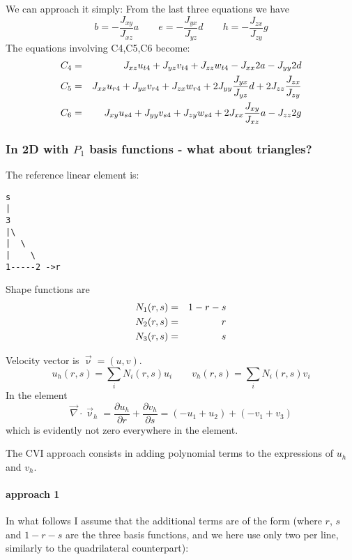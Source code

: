 We can approach it simply:
From the last three equations we have 
\[
b=-\frac{J_{xy}}{J_{xz}} a \quad\quad
e=-\frac{J_{yx}}{J_{yz}} d \quad\quad
h=-\frac{J_{zx}}{J_{zy}} g
\]
The equations involving C4,C5,C6 become:
\begin{eqnarray}
C_4 &=& J_{xz} u_{t4} + J_{yz} v_{t4} + J_{zz} w_{t4} -J_{xx} 2a - J_{yy} 2d  \nn\\ %
C_5 &=& J_{xx} u_{r4} + J_{yx} v_{r4} + J_{zx} w_{r4} +2J_{yy} \frac{J_{yx}}{J_{yz}} d + 2J_{zz} \frac{J_{zx}}{J_{zy}}  \nn\\ %
C_6 &=& J_{xy} u_{s4} + J_{yy} v_{s4} + J_{zy} w_{s4} +2J_{xx} \frac{J_{xy}}{J_{xz}} a - J_{zz} 2g  \nn\\ %
\end{eqnarray}

\subsubsection{In 2D with $P_1$ basis functions - what about triangles?}


The reference linear element is: 
\begin{verbatim}
s
|
3
|\
|  \
|    \
1-----2 ->r
\end{verbatim}

Shape functions are 
\begin{eqnarray}
N_1(r,s) &=& 1-r-s \nonumber\\
N_2(r,s) &=& r \nonumber\\
N_3(r,s) &=& s 
\end{eqnarray}

Velocity vector is $\vec\upnu=(u,v)$. 
\[
u_h(r,s)=\sum_i N_i(r,s) u_i
\qquad
v_h(r,s)=\sum_i N_i(r,s) v_i
\]
In the element
\[
\vec\nabla\cdot\vec\upnu_h = 
\frac{\partial u_h}{\partial r}
+
\frac{\partial v_h}{\partial s}
=(-u_1+u_2)+(-v_1+v_3)
\]
which is evidently not zero everywhere in the element.

The CVI approach consists in adding polynomial terms to the expressions of $u_h$ and $v_h$.

\paragraph{approach 1}
In what follows I assume that the additional terms are of the form (where $r$, $s$ and $1-r-s$ are the three basis functions, and we here use only two per line, similarly to the quadrilateral counterpart):

